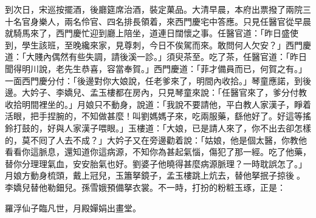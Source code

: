 到次日，宋巡按擺酒，後廳筵席治酒，裝定菓品。大清早晨，本府出票撥了兩院三十名官身樂人，兩名伶官、四名排長領着，來西門慶宅中答應。只見任醫官從早晨就騎馬來了，西門慶忙迎到廳上陪坐，道連日闊懷之事。任醫官道：「昨日盛使到，學生該班，至晚纔來家，見尊刺，今日不俟駕而來。敢問何人欠安？」西門慶道：「大賤內偶然有些失調，請後溪一診。」須臾茶至。吃了茶，任醫官道：「昨日聞得明川說，老先生恭喜，容當奉賀。」西門慶道：「菲才備員而已，何賀之有。」一面西門慶分付：「後邊對你大娘說，任老爹來了，明間內收拾。」琴童應諾，到後邊。大妗子、李嬌兒、孟玉樓都在房內，只見琴童來說：「任醫官來了，爹分付教收拾明間裡坐的。」月娘只不動身，說道：「我說不要請他，平白教人家漢子，睜着活眼，把手捏腕的，不知做甚麼！叫劉媽媽子來，吃兩服藥，繇他好了。好這等搖鈴打鼓的，好與人家漢子喂眼。」玉樓道：「大娘，已是請人來了，你不出去卻怎樣的，莫不囘了人去不成？」大妗子又在旁邊勸着說：「姑娘，他是個太醫，你教他看看你這脈息，還知道你這病源，不知你為甚起氣惱，傷犯了那一經。吃了他藥，替你分理理氣血，安安胎氣也好。劉婆子他曉得甚麼病源脈理？一時耽誤怎了。」月娘方動身梳頭，戴上冠兒，玉簫拏鏡子，孟玉樓跳上炕去，替他拏抿子掠後𩬆。李嬌兒替他勒鈿兒。孫雪娥預備拏衣裳。{}不一時，打扮的粉粧玉琢，正是：

\begin{myquote} 
羅浮仙子臨凡世，月殿嬋娟出畫堂。
\end{myquote} 

